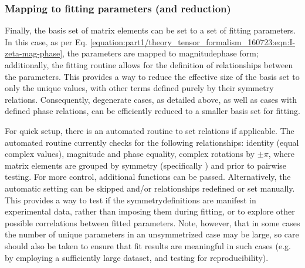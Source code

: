 \documentclass[letterpaper,table,10pt,english]{jupyterBook}
\begin{document}
\subsubsection{Mapping to fitting parameters (and reduction)}
\label{\detokenize{part2/sym-fitting-intro_240723:mapping-to-fitting-parameters-and-reduction}}\label{\detokenize{part2/sym-fitting-intro_240723:sec-basis-sets-remapping-to-fittingparams}}
\sphinxAtStartPar
Finally, the basis set of matrix elements can be set to a set of fitting parameters. In this case, as per Eq. \eqref{equation:part1/theory_tensor_formalism_160723:eqn:I-zeta-mag-phase}, the parameters are mapped to magnitude\sphinxhyphen{}phase form; additionally, the fitting routine allows for the definition of relationships between the parameters. This provides a way to reduce the effective size of the basis set to only the unique values, with other terms defined purely by their symmetry relations. Consequently, degenerate cases, as detailed above, as well as cases with defined phase relations, can be efficiently reduced to a smaller basis set for fitting.

\sphinxAtStartPar
For quick setup, there is an automated routine to set relations if applicable. The automated routine currently checks for the following relationships: identity (equal complex values), magnitude and phase equality, complex rotations by \(\pm\pi\), where matrix elements are grouped by symmetry (specifically ) and  prior to pair\sphinxhyphen{}wise testing. For more control, additional functions can be passed. Alternatively, the automatic setting can be skipped and/or relationships redefined or set manually. This provides a way to test if the symmetry\sphinxhyphen{}definitions are manifest in experimental data, rather than imposing them during fitting, or to explore other possible correlations between fitted parameters. Note, however, that in some cases the number of unique parameters in an unsymmetrized case may be large, so care should also be taken to ensure that fit results are meaningful in such cases (e.g. by employing a sufficiently large dataset, and testing for reproducibility).
\end{document}
